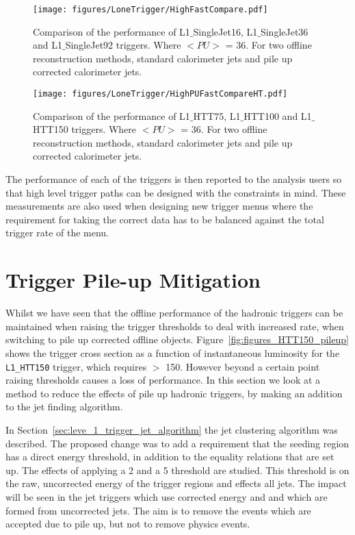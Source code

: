 \begin{figure}[htbp]
  \centering
    \texttt{[image: figures/LoneTrigger/HighFastCompare.pdf]}
  \caption{Comparison of the performance of L1$\_$SingleJet16, L1$\_$SingleJet36 and L1$\_$SingleJet92 triggers. Where $<PU>$ = 36. For two offline reconstruction methods, standard \AK calorimeter jets and pile up corrected \AK calorimeter jets.}
  \label{fig:figures_LoneTrigger_HighFastCompare}
\end{figure}

\begin{figure}[htbp]
  \centering
    \texttt{[image: figures/LoneTrigger/HighPUFastCompareHT.pdf]}
  \caption{Comparison of the performance of  L1$\_$HTT75, L1$\_$HTT100 and  L1$\_$HTT150 triggers. Where $<PU>$ = 36. For two offline reconstruction methods, standard \AK calorimeter jets and pile up corrected \AK calorimeter jets.}
  \label{fig:figures_LoneTrigger_HighPUFastCompareHT}
\end{figure}

The performance of each of the \Lone triggers is then reported to the analysis 
users so that high level trigger paths can be designed with the \Lone 
constraints in mind. These measurements are also used when designing new \Lone 
trigger menus where the requirement for taking the correct data has to be 
balanced against the total trigger rate of the \Lone menu.

\clearpage
\section{\Lone Trigger Pile-up Mitigation} %
\label{sub:lone_trigger_pile_up_mitigation}


Whilst we have seen that the offline performance of the \Lone hadronic triggers 
can be maintained when raising the trigger thresholds to deal with increased 
rate, when switching to pile up corrected offline objects. 
Figure~\ref{fig:figures_HTT150_pileup} shows the trigger cross section as a 
function of instantaneous luminosity for the \verb|L1_HTT150| trigger, which 
requires \HT $>$ \unit{150}{\GeV}. However beyond a certain point raising 
thresholds causes a loss of performance.
In this section we look at a method to reduce the effects of pile up hadronic 
\Lone triggers, by making an addition to the \Lone jet finding algorithm.

In Section~\ref{sec:leve_1_trigger_jet_algorithm} the \Lone jet clustering 
algorithm was described. The proposed change was to add a requirement that the 
seeding region has a direct energy threshold, in addition to the equality 
relations that are set up. The effects of applying a \unit{2}{\GeV} and a 
\unit{5}{\GeV} threshold are studied. This threshold is on the raw, uncorrected 
energy of the trigger regions and effects all \Lone jets. The impact will be 
seen in the \Lone jet triggers which use corrected energy and \Lone \HT and 
\HTm which are formed from uncorrected jets.
The aim is to remove the events which are accepted due to pile up, but not to 
remove physics events.

